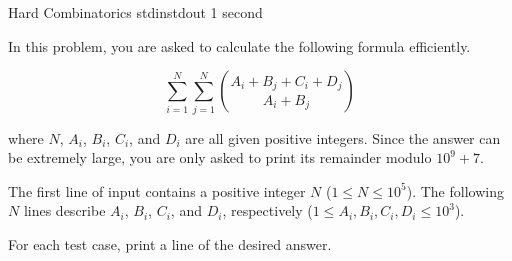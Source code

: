 \begin{problem}{Hard Combinatorics}
{stdin}{stdout}
{1 second}{}{}

In this problem, you are asked to calculate the following formula efficiently.

\begin{equation}
    \sum_{i = 1}^{N} \sum_{j = 1}^{N} { {A_i + B_j + C_i + D_j} \choose {A_i + B_j} }
\end{equation}

where $N$, $A_i$, $B_i$, $C_i$, and $D_i$ are all given positive integers. Since the answer can be extremely large, you are only asked to print its remainder modulo $10^9 + 7$.


\InputFile

The first line of input contains a positive integer $N$ ($1 \le N \le 10^5$).
The following $N$ lines describe $A_i$, $B_i$, $C_i$, and $D_i$, respectively ($1 \le A_i, B_i, C_i, D_i \le 10^3$).

\OutputFile

For each test case, print a line of the desired answer. 

\Examples

\begin{example}
%
%
\end{example}

\end{problem}
